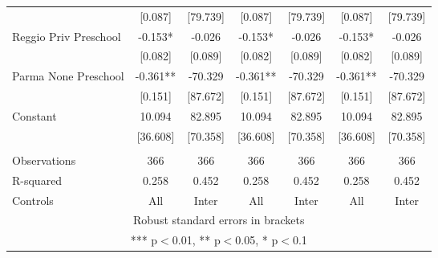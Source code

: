 \begin{tabular}{lcccccc}
 & [0.087] & [79.739] & [0.087] & [79.739] & [0.087] & [79.739] \\
Reggio Priv Preschool & -0.153* & -0.026 & -0.153* & -0.026 & -0.153* & -0.026 \\
 & [0.082] & [0.089] & [0.082] & [0.089] & [0.082] & [0.089] \\
Parma None Preschool & -0.361** & -70.329 & -0.361** & -70.329 & -0.361** & -70.329 \\
 & [0.151] & [87.672] & [0.151] & [87.672] & [0.151] & [87.672] \\
Constant & 10.094 & 82.895 & 10.094 & 82.895 & 10.094 & 82.895 \\
 & [36.608] & [70.358] & [36.608] & [70.358] & [36.608] & [70.358] \\
 &  &  &  &  &  &  \\
Observations & 366 & 366 & 366 & 366 & 366 & 366 \\
R-squared & 0.258 & 0.452 & 0.258 & 0.452 & 0.258 & 0.452 \\
 Controls & All & Inter & All & Inter & All & Inter \\ \hline
\multicolumn{7}{c}{ Robust standard errors in brackets} \\
\multicolumn{7}{c}{ *** p$<$0.01, ** p$<$0.05, * p$<$0.1} \\
\end{tabular}
